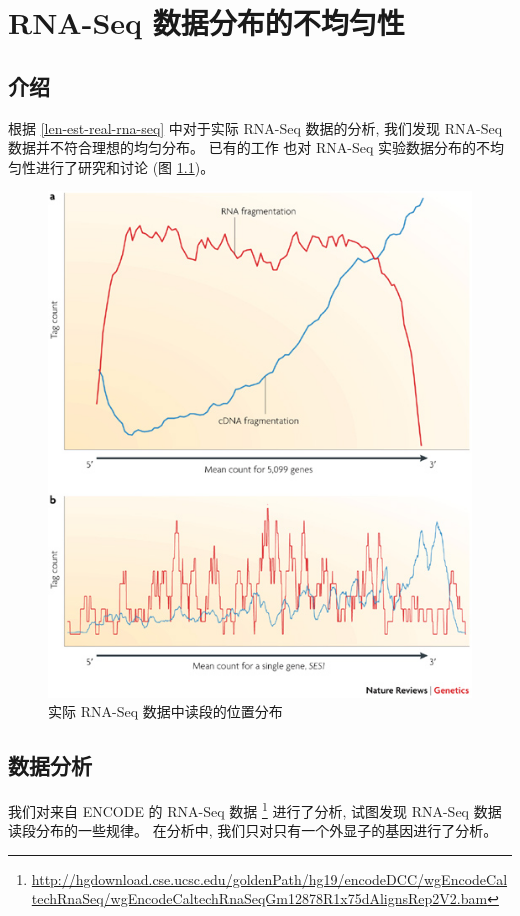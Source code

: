 \chapter{RNA-Seq 数据分布的不均匀性}
\label{chap-rna-seq-nonunif}

\section{介绍}
根据 \ref{len-est-real-rna-seq} 中对于实际 RNA-Seq 数据的分析, 
我们发现 RNA-Seq 数据并不符合理想的均匀分布。 
已有的工作 
\cite{oshlack2009transcript,roberts2011improving, 
20132535, 21176179,20167110,li2010rna} 
也对 RNA-Seq 实验数据分布的不均匀性进行了研究和讨论
 (图 \ref{rna-seq-bias})。 

\begin{figure}[!t]
\centering
\includegraphics[width=\textwidth]{figures/nonunif/rna-seq-bias.jpg}
\caption{实际 RNA-Seq 数据中读段的位置分布 \cite{wang2009rna}}
\label{rna-seq-bias}
\end{figure}

\section{数据分析}
我们对来自 ENCODE \cite{encode} 的 RNA-Seq 数据 
\footnote{\url{http://hgdownload.cse.ucsc.edu/goldenPath/hg19/encodeDCC/wgEncodeCaltechRnaSeq/wgEncodeCaltechRnaSeqGm12878R1x75dAlignsRep2V2.bam}} 
进行了分析, 试图发现 RNA-Seq 数据读段分布的一些规律。 
在分析中, 我们只对只有一个外显子的基因进行了分析。

